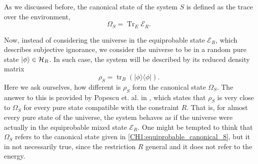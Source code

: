 
\indent As we discussed before, the canonical state of the system $S$ is defined as the trace over the environment,
\begin{equation}
\Omega_{S}=\operatorname{Tr}_{E} \mathcal{E}_{R}.
\label{CH1:Canonical_state}
\end{equation}

\indent Now, instead of considering the universe in the equiprobable state $\mathcal{E}_R$, which describes subjective ignorance, we consider the universe to be in a random pure state $\mathinner{|{\phi}\rangle}\in \mathcal{H}_R$. In such case, the system will be described by its reduced density matrix
\begin{equation}
\rho_{S}=\operatorname{tr}_{B}(|\phi\rangle\langle\phi|).
\label{CH1:Reduced_density_random_pure_state}
\end{equation}
\indent Here we ask ourselves, how different is $\rho_S$ form the canonical state $\Omega_S$. The answer to this is provided by Popescu et. al. in \cite{popescu_entanglement_2006,popescu_foundations_2005}, which states that $\rho_S$ is very close to $\Omega_S$ for every pure state compatible with the constraint $R$. That is, for almost every pure state of the universe, the system behaves as if the universe were actually in the equiprobable mixed state $\mathcal{E}_R$. One might be tempted to think that $\Omega_S$ refers to the canonical state given in \eqref{CH1:equiprobable_canonical_8}, but it in not necessarily true, since the restriction $R$ general and it does not refer to the energy.\\



